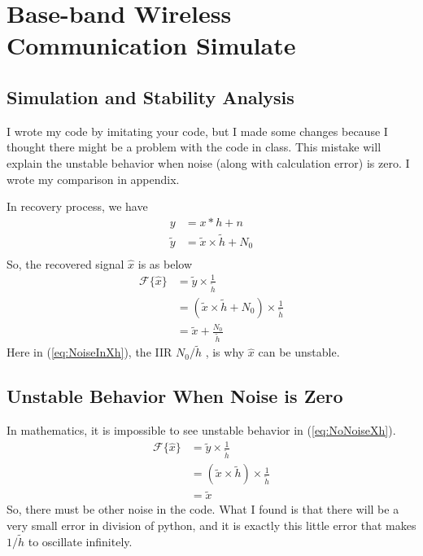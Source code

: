 \documentclass{article}
\begin{document}
\section{Base-band Wireless Communication Simulate}
\subsection{Simulation and Stability Analysis}
I wrote my code by imitating your code, but I made some changes because I thought there might be a problem with the code in class. This mistake will explain the unstable behavior when noise (along with calculation error) is zero. I wrote my comparison in appendix.

In recovery process, we have
\begin{equation}
	\begin{aligned}
		y &= x * h + n \\ 
		\tilde{y} &= \tilde{x} \times \tilde{h} + N_0 \\
	\end{aligned}
\end{equation}
So, the recovered signal $\hat{x}$ is as below
\begin{equation}
	\begin{aligned}
		\mathcal{F}\{\hat{x}\} &= \tilde{y} \times \frac{1}{\tilde{h}} \\  
		&= ( \tilde{x} \times \tilde{h} + N_0 ) \times \frac{1}{\tilde{h}} \\ 
		&= \tilde{x} + \frac{N_0}{\tilde{h}}
	\end{aligned}
	\label{eq:NoiseInXh}
\end{equation}
Here in (\ref{eq:NoiseInXh}), the IIR $N_0/\tilde{h}$ , is why $\hat{x}$ can be unstable.

\subsection{Unstable Behavior When Noise is Zero}
In mathematics, it is impossible to see unstable behavior in (\ref{eq:NoNoiseXh}).
\begin{equation}
	\begin{aligned}
		\mathcal{F}\{\hat{x}\} &= \tilde{y} \times \frac{1}{\tilde{h}} \\  
		&= ( \tilde{x} \times \tilde{h}) \times \frac{1}{\tilde{h}} \\ 
		&= \tilde{x}
	\end{aligned}
\label{eq:NoNoiseXh}
\end{equation}
So, there must be other noise in the code. What I found is that there will be a very small error in division of python, and it is exactly this little error that makes $1/\tilde{h}$ to oscillate infinitely.
\end{document}
